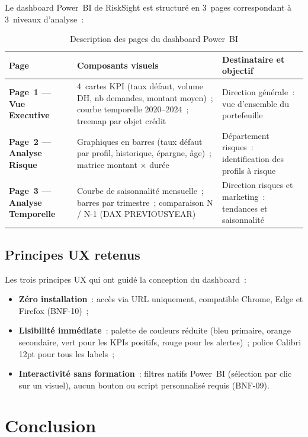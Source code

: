 \documentclass[12pt, a4paper]{report}
\begin{document}
Le dashboard Power~BI de RiskSight est structuré en 3~pages correspondant à
3~niveaux d'analyse~:

\begin{table}[H]
\centering
\caption{Description des pages du dashboard Power~BI}
\label{tab:maquettes}
\renewcommand{\arraystretch}{1.5}
\begin{tabularx}{\textwidth}{p{4cm} p{5.5cm} X}
\toprule
\rowcolor{primary!12}
Page & Composants visuels & Destinataire et objectif \\
\midrule
\textbf{Page~1 --- Vue Executive}   & 4~cartes KPI (taux défaut, volume DH, nb demandes, montant moyen)~; courbe temporelle 2020--2024~; treemap par objet crédit & Direction générale~: vue d'ensemble du portefeuille \\
\textbf{Page~2 --- Analyse Risque}  & Graphiques en barres (taux défaut par profil, historique, épargne, âge)~; matrice montant × durée & Département risques~: identification des profils à risque \\
\textbf{Page~3 --- Analyse Temporelle} & Courbe de saisonnalité mensuelle~; barres par trimestre~; comparaison N / N-1 (DAX PREVIOUSYEAR) & Direction risques et marketing~: tendances et saisonnalité \\
\bottomrule
\end{tabularx}
\end{table}

\subsection{Principes UX retenus}

Les trois principes UX qui ont guidé la conception du dashboard~:
\begin{itemize}[leftmargin=1.5em]
  \item \textbf{Zéro installation}~: accès via URL uniquement, compatible
    Chrome, Edge et Firefox (BNF-10)~;
  \item \textbf{Lisibilité immédiate}~: palette de couleurs réduite (bleu
    primaire, orange secondaire, vert pour les KPIs positifs, rouge pour
    les alertes)~; police Calibri 12pt pour tous les labels~;
  \item \textbf{Interactivité sans formation}~: filtres natifs Power~BI
    (sélection par clic sur un visuel), aucun bouton ou script personnalisé
    requis (BNF-09).
\end{itemize}

\section{Conclusion}
\end{document}
